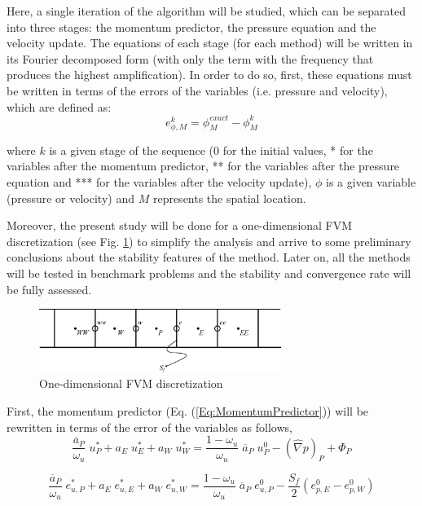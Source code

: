 \documentclass[final,3p,times,11pt,onecolumn]{myElsarticle}
\numberwithin{equation}{section}
\begin{document}
Here, a single iteration of the algorithm will be studied, which can be separated into three stages: the momentum predictor, the pressure equation and the velocity update. The equations of each stage (for each method) will be written in its Fourier decomposed form (with only the term with the frequency that produces the highest amplification). In order to do so, first, these equations must be written in terms of the errors of the variables (i.e. pressure and velocity), which are defined as:
\begin{equation}
    e^k_{\phi,M} = \phi^{exact}_{M}-\phi_M^{k}
\end{equation}

\noindent where $k$ is a given stage of the sequence ($0$ for the initial values, * for the variables after the momentum predictor, ** for the variables after the pressure equation and *** for the variables after the velocity update), $\phi$ is a given variable (pressure or velocity) and $M$ represents the spatial location.

Moreover, the present study will be done for a one-dimensional FVM discretization (see Fig. \ref{fig:4a}) to simplify the analysis and arrive to some preliminary conclusions about the stability features of the method. Later on, all the methods will be tested in benchmark problems and the stability and convergence rate will be fully assessed. 

\begin{figure}[t!]
    \centering
    \includegraphics[width=0.7\textwidth]{fig/cells.eps}
    \caption{One-dimensional FVM discretization}
    \label{fig:4a}
\end{figure}

First, the momentum predictor (Eq. (\ref{Eq:MomentumPredictor})) will be rewritten in terms of the error of the variables as follows,
\begin{equation}
    \dfrac{\overline{a}_P}{\omega_u} \; u_P^* + a_E \; u_E^* + a_W \; u_W^* = \dfrac{1-\omega_u}{\omega_u} \; \overline{a}_P \; u_P^0 - (\hat{\nabla} p)_P + \Phi_P
\end{equation}

\begin{equation}
    \dfrac{\overline{a}_P}{\omega_u} \; e_{u,P}^* + a_E \; e_{u,E}^* + a_W \; e_{u,W}^* = \dfrac{1-\omega_u}{\omega_u} \; \overline{a}_P \; e_{u,P}^0 - \dfrac{S_f}{2} (e^0_{p,E}-e^0_{p,W})
    \label{eq:MPerror}
\end{equation}
\end{document}
